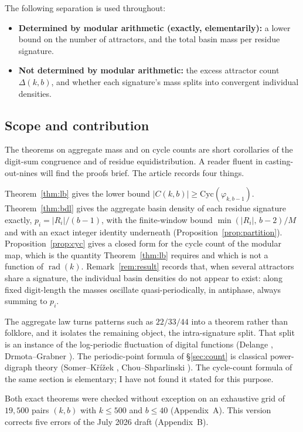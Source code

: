 \documentclass[11pt]{article}
\theoremstyle{definition}
\theoremstyle{remark}
\newcommand{\Cyc}{\mathrm{Cyc}}
\DeclareMathOperator{\rad}{rad}
\begin{document}
The following separation is used throughout:
\begin{itemize}
\item \textbf{Determined by modular arithmetic (exactly, elementarily):} a lower bound on the number of attractors, and the total basin mass per residue signature.
\item \textbf{Not determined by modular arithmetic:} the excess attractor count $\Delta(k,b)$, and whether each signature's mass splits into convergent individual densities.
\end{itemize}

\subsection{Scope and contribution}

The theorems on aggregate mass and on cycle counts are short corollaries of the digit-sum congruence and of residue equidistribution. A reader fluent in casting-out-nines will find the proofs brief. The article records four things.

Theorem~\ref{thm:lb} gives the lower bound $|C(k,b)| \ge \Cyc(\varphi_{k,b-1})$. Theorem~\ref{thm:bdl} gives the aggregate basin density of each residue signature exactly, $p_i = |R_i|/(b-1)$, with the finite-window bound $\min(|R_i|,\,b-2)/M$ and with an exact integer identity underneath (Proposition~\ref{prop:partition}). Proposition~\ref{prop:cyc} gives a closed form for the cycle count of the modular map, which is the quantity Theorem~\ref{thm:lb} requires and which is not a function of $\rad(k)$. Remark~\ref{rem:result} records that, when several attractors share a signature, the individual basin densities do not appear to exist: along fixed digit-length the masses oscillate quasi-periodically, in antiphase, always summing to $p_i$.

The aggregate law turns patterns such as $22/33/44$ into a theorem rather than folklore, and it isolates the remaining object, the intra-signature split. That split is an instance of the log-periodic fluctuation of digital functions (Delange \cite{delange}, Drmota--Grabner \cite{drmota-grabner}). The periodic-point formula of \S\ref{sec:count} is classical power-digraph theory (Somer--K\v{r}\'i\v{z}ek \cite{somer-krizek}, Chou--Shparlinski \cite{chou-shparlinski}). The cycle-count formula of the same section is elementary; I have not found it stated for this purpose.

Both exact theorems were checked without exception on an exhaustive grid of $19{,}500$ pairs $(k,b)$ with $k \le 500$ and $b \le 40$ (Appendix~A). This version corrects five errors of the July 2026 draft (Appendix~B).
\end{document}
